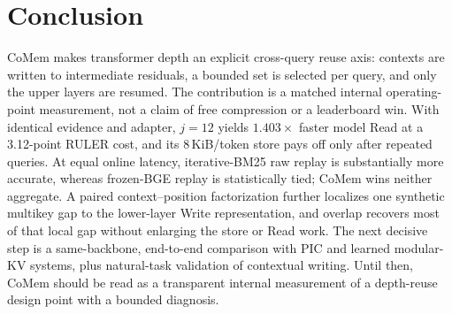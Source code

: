\section{Conclusion}
\label{sec:conclusion}

CoMem makes transformer depth an explicit cross-query reuse axis: contexts are
written to intermediate residuals, a bounded set is selected per query, and only
the upper layers are resumed. The contribution is a matched internal
operating-point measurement, not a
claim of free compression or a leaderboard win. With identical evidence and
adapter, $j{=}12$ yields $1.403\times$ faster model Read at a 3.12-point RULER
cost, and its 8\,KiB/token store pays off only after repeated queries. At equal
online latency, iterative-BM25 raw replay is substantially more accurate,
whereas frozen-BGE replay is statistically tied; CoMem wins neither aggregate.
A paired
context--position factorization further localizes one synthetic multikey gap to
the lower-layer Write representation, and overlap recovers most of that local
gap without enlarging the store or Read work. The next decisive step is a
same-backbone, end-to-end comparison with PIC and learned modular-KV systems,
plus natural-task validation of contextual writing. Until then, CoMem should be
read as a transparent internal measurement of a depth-reuse design point with
a bounded diagnosis.
